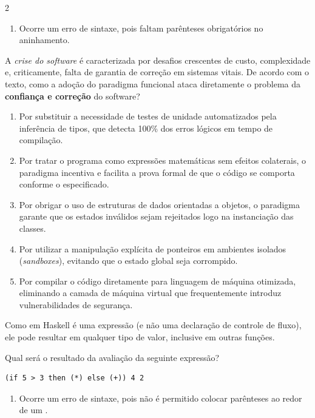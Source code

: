 \documentclass[a4paper,10pt,brazil]{article}
\begin{document}
\begin{multicols}{2}
\begin{enumerate}
  \item Ocorre um erro de sintaxe, pois faltam parênteses obrigatórios no aninhamento.


\end{enumerate}

A \emph{crise do software} é caracterizada por desafios crescentes de custo, complexidade e, criticamente, falta de garantia de correção em sistemas vitais. De acordo com o texto, como a adoção do paradigma funcional ataca diretamente o problema da \textbf{confiança e correção} do software?

\begin{enumerate}
  \item Por substituir a necessidade de testes de unidade automatizados pela inferência de tipos, que detecta 100\% dos erros lógicos em tempo de compilação.

  \item Por tratar o programa como expressões matemáticas sem efeitos colaterais, o paradigma incentiva e facilita a prova formal de que o código se comporta conforme o especificado.

  \item Por obrigar o uso de estruturas de dados orientadas a objetos, o paradigma garante que os estados inválidos sejam rejeitados logo na instanciação das classes.

  \item Por utilizar a manipulação explícita de ponteiros em ambientes isolados (\emph{sandboxes}), evitando que o estado global seja corrompido.

  \item Por compilar o código diretamente para linguagem de máquina otimizada, eliminando a camada de máquina virtual que frequentemente introduz vulnerabilidades de segurança.


\end{enumerate}

Como  em Haskell é uma expressão (e não uma declaração de controle de fluxo), ele pode resultar em qualquer tipo de valor, inclusive em outras funções. 

Qual será o resultado da avaliação da seguinte expressão?
\begin{verbatim}
(if 5 > 3 then (*) else (+)) 4 2
\end{verbatim}

\begin{enumerate}
  \item Ocorre um erro de sintaxe, pois não é permitido colocar parênteses ao redor de um .


\end{enumerate}
\end{multicols}
\end{document}
